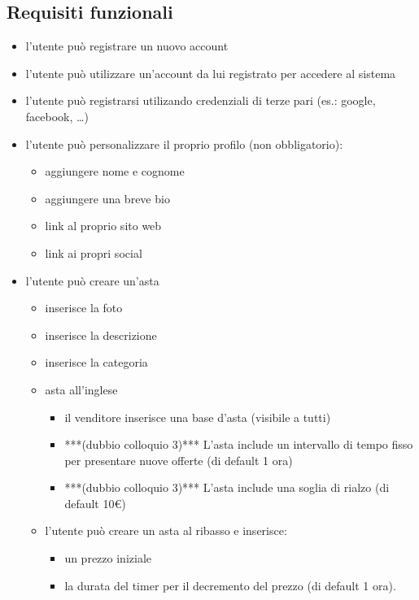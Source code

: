 \subsection{Requisiti funzionali}
\begin{itemize}
	\item l'utente può registrare un nuovo account
	\item l'utente può utilizzare un'account da lui registrato per accedere al sistema
	\item l'utente può registrarsi utilizando credenziali di terze pari (es.: google, facebook, …)
	\item l'utente può personalizzare il proprio profilo (non obbligatorio):
	      \begin{itemize}[label={\tiny$\blacksquare$}]
		      \renewcommand{\labelitemi}{\tiny$\blacksquare$}
		      \item aggiungere nome e cognome
		      \item aggiungere una breve bio
		      \item link al proprio sito web
		      \item link ai propri social
	      \end{itemize}
	      \medskip
	\item l'utente può creare un'asta
	      \begin{itemize}[label={\tiny$\blacksquare$}]
		      \item inserisce la foto
		      \item inserisce la descrizione
		      \item inserisce la categoria
		      \item asta all'inglese
		            \begin{itemize}[label={\tiny$-$}]
			            \item il venditore inserisce una base d'asta (visibile a tutti)
			            \item ***(dubbio colloquio 3)*** L'asta include un intervallo di tempo fisso per presentare nuove offerte (di default 1 ora)
			            \item ***(dubbio colloquio 3)*** L'asta include una soglia di rialzo (di default 10€)
		            \end{itemize}
		      \item l'utente può creare un asta al ribasso e inserisce:
		            \begin{itemize}[label={\tiny$-$}]
			            \item un prezzo iniziale
			            \item la durata del timer per il decremento del prezzo (di default 1 ora).

\end{itemize}
\end{itemize}
\end{itemize}
